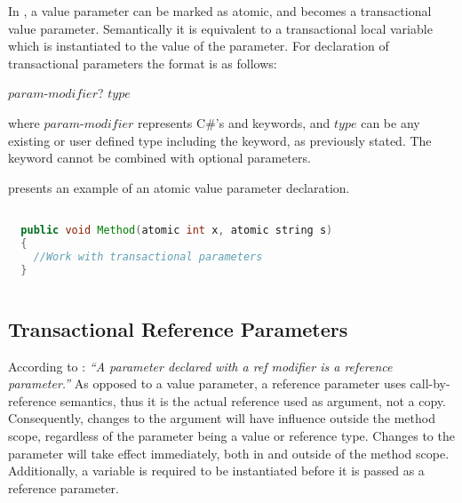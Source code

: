 In \stmnamesp, a value parameter can be marked as atomic, and becomes a transactional value parameter. Semantically it is equivalent to a transactional local variable which is instantiated to the value of the parameter.\cite[p. 76]{sestoft2011c} 
For declaration of transactional parameters the format is as follows:

 $param$-$modifier$? $type$ 

where $param$-$modifier$ represents C\#'s  and  keywords, and $type$ can be any existing or user defined type including the  keyword, as previously stated. The  keyword cannot be combined with optional parameters.

 presents an example of an atomic value parameter declaration.

\begin{lstlisting}[label=lst:design_value_parameter,
  caption={Transactional Value Parameter},
  language=Java,  
  showspaces=false,
  showtabs=false,
  breaklines=true,
  showstringspaces=false,
  breakatwhitespace=true,
  commentstyle=\color{greencomments},
  keywordstyle=\color{bluekeywords},
  stringstyle=\color{redstrings},
  morekeywords={atomic, retry, orElse, var, get, set}]  % Start your code-block

  public void Method(atomic int x, atomic string s)
  {
  	//Work with transactional parameters
  }
    
\end{lstlisting}


\subsection{Transactional Reference Parameters}
\label{subsec:stm_desgin_ref_parameters}
According to \cite[p. 97]{csharp2013specificaiton}: \textit{``A parameter declared with a ref modifier is a reference parameter.''} As opposed to a value parameter, a reference parameter uses call-by-reference semantics, thus it is the actual reference used as argument, not a copy. Consequently, changes to the argument will have influence outside the method scope, regardless of the parameter being a value or reference type. Changes to the parameter will take effect immediately, both in and outside of the method scope\cite[p. 42]{sestoft2011c}. Additionally, a variable is required to be instantiated before it is passed as a reference parameter\cite[p. 97]{csharp2013specificaiton}.

